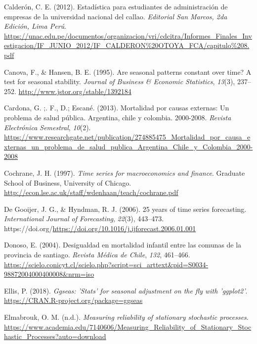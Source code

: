 \documentclass[
]{article}
\newlength{\cslhangindent}
\newlength{\cslentryspacingunit} %
\newenvironment{CSLReferences}[2] %
 {%
  \setlength{\parindent}{0pt}
  \ifodd #1
  \let\oldpar\par
  \def\par{\hangindent=\cslhangindent\oldpar}
  \fi
  \setlength{\parskip}{#2\cslentryspacingunit}
 }%
 {}
\begin{document}
\begin{CSLReferences}{1}{0}
\leavevmode{}%
Calderón, C. E. (2012). Estadística para estudiantes de administración
de empresas de la universidad nacional del callao. \emph{Editorial San
Marcos, 2da Edición, Lima Perú}.
\url{https://unac.edu.pe/documentos/organizacion/vri/cdcitra/Informes_Finales_Investigacion/IF_JUNIO_2012/IF_CALDERON\%20OTOYA_FCA/capitulo\%208.pdf}

\leavevmode{}%
Canova, F., \& Hansen, B. E. (1995). Are seasonal patterns constant over
time? A test for seasonal stability. \emph{Journal of Business \&
Economic Statistics}, \emph{13}(3), 237--252.
\url{http://www.jstor.org/stable/1392184}

\leavevmode{}%
Cardona, G. ;. F., D.; Escané. (2013). Mortalidad por causas externas:
Un problema de salud pública. Argentina, chile y colombia. 2000-2008.
\emph{Revista Electrónica Semestral}, \emph{10}(2).
\url{https://www.researchgate.net/publication/274885475_Mortalidad_por_causa_externas_un_problema_de_salud_publica_Argentina_Chile_y_Colombia_2000-2008}

\leavevmode{}%
Cochrane, J. H. (1997). \emph{Time series for macroeconomics and
finance}. Graduate School of Business, University of Chicago.
\url{http://econ.lse.ac.uk/staff/wdenhaan/teach/cochrane.pdf}

\leavevmode{}%
De Gooijer, J. G., \& Hyndman, R. J. (2006). 25 years of time series
forecasting. \emph{International Journal of Forecasting}, \emph{22}(3),
443--473.
https://doi.org/\url{https://doi.org/10.1016/j.ijforecast.2006.01.001}

\leavevmode{}%
Donoso, E. (2004). Desigualdad en mortalidad infantil entre las comunas
de la provincia de santiago. \emph{Revista Médica de Chile}, \emph{132},
461--466.
\url{https://scielo.conicyt.cl/scielo.php?script=sci_arttext\&pid=S0034-98872004000400008\&nrm=iso}

\leavevmode{}%
Ellis, P. (2018). \emph{Ggseas: 'Stats' for seasonal adjustment on the
fly with 'ggplot2'}. \url{https://CRAN.R-project.org/package=ggseas}

\leavevmode{}%
Elmabrouk, O. M. (n.d.). \emph{Measuring reliability of stationary
stochastic processes}.
\url{https://www.academia.edu/7140606/Measuring_Reliability_of_Stationary_Stochastic_Processes?auto=download}


\end{CSLReferences}
\end{document}
